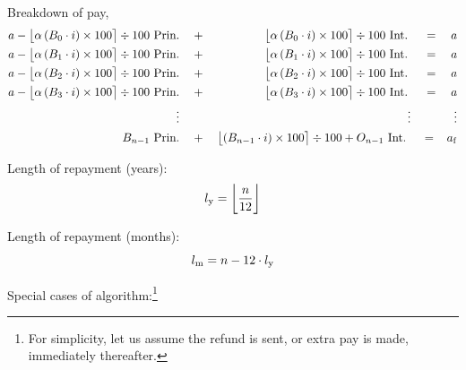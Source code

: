 \documentclass[12pt,letterpaper,oneside]{article}
\theoremstyle{remark} %
\begin{document}
	\newpage
	Breakdown of pay,
	\small
	\begin{align*}
	a-\big\lfloor{\alpha\left(B_{0}\cdot i\right)\times 100}\big\rceil\div 100\mbox{\ Prin.}&\quad +\quad \qquad\quad\ \ \ \big\lfloor{\alpha\left(B_{0}\cdot i\right)\times 100}\big\rceil\div 100\mbox{\ Int.}&\, =\quad a&\\
	a-\big\lfloor{\alpha\left(B_{1}\cdot i\right)\times 100}\big\rceil\div 100\mbox{\ Prin.}&\quad +\quad \qquad\quad\ \ \ \big\lfloor{\alpha\left(B_{1}\cdot i\right)\times 100}\big\rceil\div 100\mbox{\ Int.}&\, =\quad a&\\
	a-\big\lfloor{\alpha\left(B_{2}\cdot i\right)\times 100}\big\rceil\div 100\mbox{\ Prin.}&\quad +\quad \qquad\quad\ \ \ \big\lfloor{\alpha\left(B_{2}\cdot i\right)\times 100}\big\rceil\div 100\mbox{\ Int.}&\, =\quad a&\\
	a-\big\lfloor{\alpha\left(B_{3}\cdot i\right)\times 100}\big\rceil\div 100\mbox{\ Prin.}&\quad +\quad \qquad\quad\ \ \ \big\lfloor{\alpha\left(B_{3}\cdot i\right)\times 100}\big\rceil\div 100\mbox{\ Int.}&\, =\quad a&\\
	\vdots&\qquad\qquad\qquad\qquad\qquad\qquad\qquad\qquad\qquad\ \ \ \,\,\vdots&\vdots&\\
	B_{n-1}\mbox{\ Prin.}&\quad +\quad \big\lfloor{\left(B_{n-1}\cdot i\right)\times 100}\big\rceil\div 100+O_{n-1}\mbox{\ Int.}&\, =\ \ \,a_{\rm{f}}&
	\end{align*}
	\normalsize

	\setlength\parindent{0pt} Length of repayment (years):
	$$l_{\rm{y}}=\bigg\lfloor{\frac{n}{12}}\bigg\rfloor$$

	\setlength\parindent{0pt} Length of repayment (months):
	$$l_{\rm{m}}=n-12\cdot l_{\rm{y}}$$

	\setlength\parindent{0pt} Special cases of algorithm:\footnote{For simplicity, let us assume the refund is sent, or extra pay is made, immediately thereafter.}
	\begin{figure}[h]
	\centering
	\begin{minipage}{1.0\linewidth}
	\begin{algorithm}[H]
	\end{algorithm}
	\end{minipage}
	\end{figure}
\end{document}
